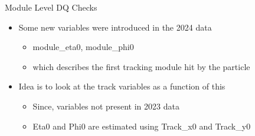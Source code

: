 \begin{frame}{Module Level DQ Checks}
    \begin{itemize}
        \item Some new variables were introduced in the 2024 data
        \begin{itemize}
            \item module\_eta0, module\_phi0
            \item which describes the first tracking module hit by the particle
        \end{itemize}
        \item Idea is to look at the track variables as a function of this
        \begin{itemize}
            \item Since, variables not present in 2023 data
            \item Eta0 and Phi0 are estimated using Track\_x0 and Track\_y0
        \end{itemize}
        

    \end{itemize}
\end{frame}


